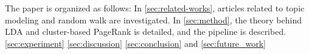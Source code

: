 The paper is organized as follows:
In \autoref{sec:related-works}, articles related to topic modeling and random walk are investigated.
In \autoref{sec:method}, the theory behind LDA and cluster-based PageRank is detailed, and the pipeline is described.
\autoref{sec:experiment}
\autoref{sec:discussion}
\autoref{sec:conclusion} and \autoref{sec:future_work}
